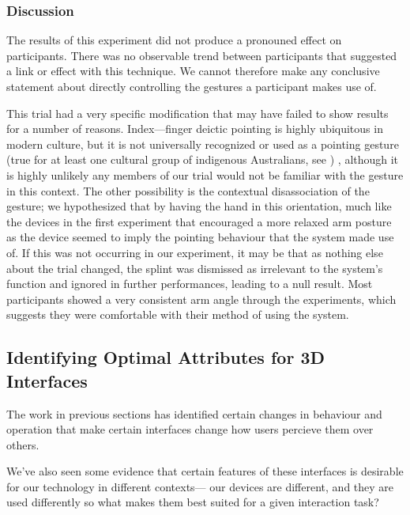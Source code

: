 
\subsubsection{Discussion}

The results of this experiment did not produce a pronouned effect on participants. There was no observable trend between participants that suggested a link or effect with this technique. We cannot therefore make any conclusive statement about directly controlling the gestures a participant makes use of.


This trial had a very specific modification that may have failed to show results for a number of reasons. Index---finger deictic pointing is highly ubiquitous in modern culture, but it is not universally recognized or used as a pointing gesture (true for at least one cultural group of indigenous Australians, see \cite{Wilkins2003}) , although it is highly unlikely any members of our trial would not be familiar with the gesture in this context. The other possibility is the contextual disassociation of the gesture; we hypothesized that by having the hand in this orientation, much like the devices in the first experiment that encouraged a more relaxed arm posture as the device seemed to imply the pointing behaviour that the system made use of. If this was not occurring in our experiment, it may be that as nothing else about the trial changed, the splint was dismissed as irrelevant to the system's function and ignored in further performances, leading to a null result. Most participants showed a very consistent arm angle through the experiments, which suggests they were comfortable with their method of using the system.

\subsection{Identifying Optimal Attributes for 3D Interfaces}

The work in previous sections has identified certain changes in behaviour and operation that make certain interfaces change how users percieve them over others.

We've also seen some evidence that certain features of these interfaces is desirable for our technology in different contexts--- our devices are different, and they are used differently so what makes them best suited for a given interaction task? 

